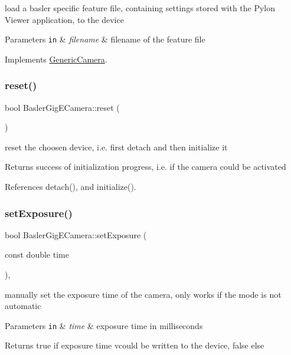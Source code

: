 load a basler specific feature file, containing settings stored with the Pylon Viewer application, to the device 
\begin{DoxyParams}[1]{Parameters}
\mbox{\tt in}  & {\em filename} & filename of the feature file \\
\hline
\end{DoxyParams}


Implements \hyperlink{classGenericCamera_a393e01ba0b1bc18ad43f00cc62ccea4e}{Generic\+Camera}.

\mbox{\label{classBaslerGigECamera_ad1f9154be71d1dba2e456fc404198774}} 
\subsubsection{\texorpdfstring{reset()}{reset()}}
{\footnotesize\ttfamily bool Basler\+Gig\+E\+Camera\+::reset (\begin{DoxyParamCaption}{ }\end{DoxyParamCaption})}

reset the choosen device, i.\+e. first detach and then initialize it \begin{DoxyReturn}{Returns}
success of initialization progress, i.\+e. if the camera could be activated 
\end{DoxyReturn}


References detach(), and initialize().

\mbox{\label{classBaslerGigECamera_a99f9cd699aac5cb1025cb7086fbba7c0}} 
\subsubsection{\texorpdfstring{set\+Exposure()}{setExposure()}}
{\footnotesize\ttfamily bool Basler\+Gig\+E\+Camera\+::set\+Exposure (\begin{DoxyParamCaption}\item[{const double}]{time }\end{DoxyParamCaption})\hspace{0.3cm}{\ttfamily [override]}, {\ttfamily [virtual]}}

manually set the exposure time of the camera, only works if the mode is not automatic 
\begin{DoxyParams}[1]{Parameters}
\mbox{\tt in}  & {\em time} & exposure time in milliseconds \\
\hline
\end{DoxyParams}
\begin{DoxyReturn}{Returns}
true if exposure time vcould be written to the device, false else 
\end{DoxyReturn}



